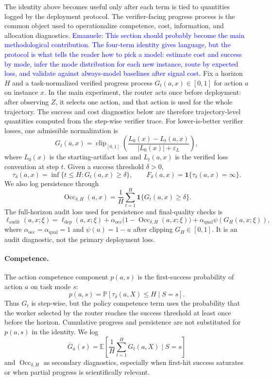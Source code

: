 \documentclass{article}
\DeclareMathOperator{\Occ}{Occ}
\newcommand{\E}{\mathbb{E}}
\newcommand{\Prb}{\mathbb{P}}
\newcommand{\eps}{\varepsilon}
\newcommand{\one}{\mathbf{1}}
\begin{document}
The identity above becomes useful only after each term is tied to quantities logged by the deployment protocol.
The verifier-facing progress process is the common object used to operationalize competence, cost, information, and allocation diagnostics.
\textcolor{blue}{Emanuele: This section should probably become the main methodological contribution. The four-term identity gives language, but the protocol is what tells the reader how to pick a model: estimate cost and success by mode, infer the mode distribution for each new instance, route by expected loss, and validate against always-model baselines after signal cost.}
Fix a horizon $H$ and a task-normalized verified progress process $G_t(a,x)\in[0,1]$ for action $a$ on instance $x$.
In the main experiment, the router acts once before deployment: after observing $Z$, it selects one action, and that action is used for the whole trajectory.
The success and cost diagnostics below are therefore trajectory-level quantities computed from the step-wise verifier trace.
For lower-is-better verifier losses, one admissible normalization is
\[
G_t(a,x)
=
\operatorname{clip}_{[0,1]}\!\left(
\frac{L_0(x)-L_t(a,x)}{|L_0(x)|+\eps_L}
\right),
\]
where $L_0(x)$ is the starting-artifact loss and $L_t(a,x)$ is the verified loss convention at step $t$.
Given a success threshold $\delta>0$,
\[
\tau_\delta(a,x)=\inf\{t\le H:G_t(a,x)\ge \delta\},
\qquad
F_\delta(a,x)=\one\{\tau_\delta(a,x)=\infty\}.
\]
We also log persistence through
\[
\Occ_{\delta,H}(a,x)=\frac{1}{H}\sum_{t=1}^H \one\{G_t(a,x)\ge \delta\}.
\]
The full-horizon audit loss used for persistence and final-quality checks is
\begin{equation}
\ell_{\mathrm{audit}}(a,x;\xi)
=
\ell_{\mathrm{dep}}(a,x;\xi)
+\alpha_{\mathrm{occ}}\bigl(1-\Occ_{\delta,H}(a,x;\xi)\bigr)
+\alpha_{\mathrm{qual}}\psi(G_H(a,x;\xi)),
\label{eq:audit-loss}
\end{equation}
where \(\alpha_{\mathrm{occ}}=\alpha_{\mathrm{qual}}=1\) and \(\psi(u)=1-u\) after clipping \(G_H\in[0,1]\).
It is an audit diagnostic, not the primary deployment loss.

\paragraph{Competence.}
The action competence component $p(a,s)$ is the first-success probability of action $a$ on task mode $s$:
\[
p(a,s)=\Prb[\tau_\delta(a,X)\le H\mid S=s].
\]
Thus $G_t$ is step-wise, but the policy competence term uses the probability that the worker selected by the router reaches the success threshold at least once before the horizon.
Cumulative progress and persistence are not substituted for $p(a,s)$ in the identity.
We log
\[
\bar G_a(s)=\E\!\left[\frac{1}{H}\sum_{t=1}^H G_t(a,X)\mid S=s\right]
\]
and $\Occ_{\delta,H}$ as secondary diagnostics, especially when first-hit success saturates or when partial progress is scientifically relevant.
\end{document}
